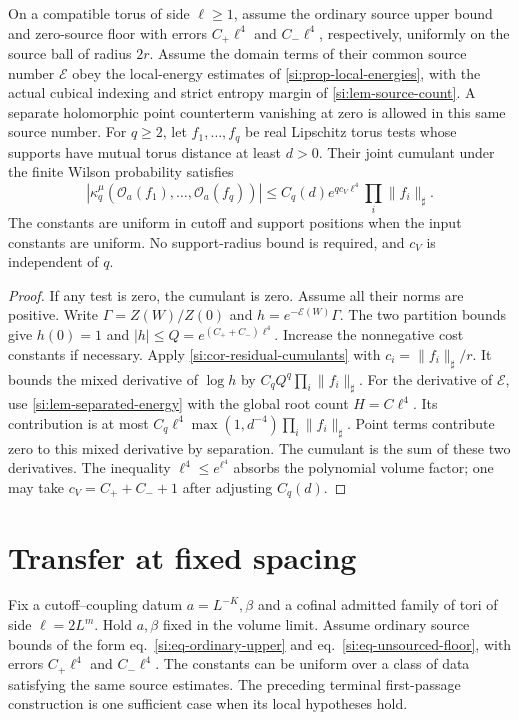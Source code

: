 \documentclass[11pt,letterpaper,reqno]{amsart}
\makeatletter
\numberwithin{equation}{section}
\renewcommand{\eqref}[1]{\textup{eq.~\ref{#1}}}
\theoremstyle{definition}
\newcommand{\ms@majorstart}{%
  \pushQED{\qed}\renewcommand{\qedsymbol}{$\blacksquare\square$}}
\newenvironment{corollary}[1][]{\ms@majorstart\ms@corollary[#1]}
  {\popQED\endms@corollary}
\theoremstyle{remark}
\makeatother
\begin{document}
\begin{samepage}
\begin{corollary}[Finite-torus separated cumulants]
\label{si:cor-finite-torus-cumulants}
On a compatible torus of side $\ell\ge1$, assume the ordinary
source upper bound and zero-source floor with errors
$C_+\ell^4$ and $C_-\ell^4$, respectively, uniformly on the
source ball of radius $2r$. Assume the domain terms of their
common source number $\mathcal E$ obey the local-energy estimates
of \cref{si:prop-local-energies}, with the actual cubical indexing
and strict entropy margin of \cref{si:lem-source-count}.
A separate holomorphic point counterterm vanishing at zero is
allowed in this same source number. For $q\ge2$, let
$f_1,\ldots,f_q$ be real Lipschitz
torus tests whose supports have mutual torus distance at least
$d>0$. Their joint cumulant under the finite Wilson probability
satisfies
\[
 |\kappa_q^{\mu}(\mathcal O_a(f_1),\ldots,\mathcal O_a(f_q))|
 \le C_q(d)e^{q c_V\ell^4}\prod_i\|f_i\|_\sharp .
\]
The constants are uniform in cutoff and support positions when
the input constants are uniform. No support-radius bound is
required, and $c_V$ is independent of $q$.
\end{corollary}
\end{samepage}
\begin{proof}
If any test is zero, the cumulant is zero. Assume all their
norms are positive. Write $\Gamma=Z(W)/Z(0)$ and
$h=e^{-\mathcal E(W)}\Gamma$.
The two partition bounds give $h(0)=1$ and
$|h|\le Q=e^{(C_++C_-)\ell^4}$. Increase the nonnegative cost
constants if necessary. Apply \cref{si:cor-residual-cumulants}
with $c_i=\|f_i\|_\sharp/r$. It bounds the mixed derivative of
$\log h$ by $C_qQ^q\prod_i\|f_i\|_\sharp$.
For the derivative of $\mathcal E$, use
\cref{si:lem-separated-energy} with the global root count
$H=C\ell^4$. Its contribution is at most
$C_q\ell^4\max(1,d^{-4})\prod_i\|f_i\|_\sharp$.
Point terms contribute zero to this mixed derivative by separation.
The cumulant is the sum of these two derivatives. The inequality
$\ell^4\le e^{\ell^4}$ absorbs the polynomial volume factor;
one may take $c_V=C_++C_-+1$ after adjusting $C_q(d)$.
\end{proof}

\section{Transfer at fixed spacing}\label{si:sec-state-transfer}

Fix a cutoff--coupling datum $a=L^{-K},\beta$ and a cofinal admitted
family of tori of side $\ell=2L^m$. Hold $a,\beta$ fixed in the
volume limit. Assume ordinary source bounds of the form
\eqref{si:eq-ordinary-upper} and \eqref{si:eq-unsourced-floor}, with
errors $C_+\ell^4$ and $C_-\ell^4$. The constants can be uniform
over a class of data satisfying the same source estimates. The
preceding terminal first-passage construction is one sufficient
case when its local hypotheses hold.
\end{document}
